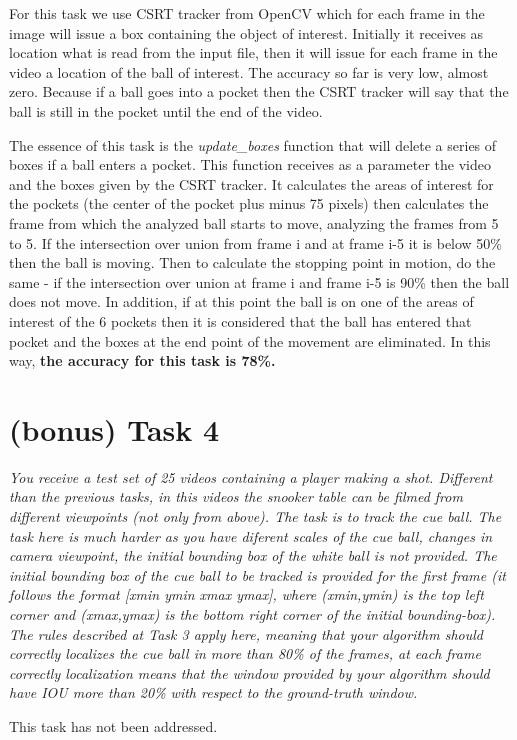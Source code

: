 \documentclass[12pt]{article}
\begin{document}
For this task we use CSRT tracker from OpenCV which for each frame in the image will issue a box containing 
the object of interest. Initially it receives as location what is read from the input file, then it will 
issue for each frame in the video a location of the ball of interest. The accuracy so far is very low, 
almost zero. Because if a ball goes into a pocket then the CSRT tracker will say that the ball is still 
in the pocket until the end of the video. \par

The essence of this task is the \emph{update\_boxes} function that will delete a series of boxes if a ball 
enters a pocket. This function receives as a parameter the video and the boxes given by the CSRT 
tracker. It calculates the areas of interest for the pockets (the center of the pocket plus minus 
75 pixels) then calculates the frame from which the analyzed ball starts to move, analyzing the 
frames from 5 to 5. If the intersection over union from frame i and at frame i-5 it is below 50\% then 
the ball is moving. Then to calculate the stopping point in motion, do the same - if the intersection 
over union at frame i and frame i-5 is 90\% then the ball does not move. In addition, if at this point 
the ball is on one of the areas of interest of the 6 pockets then it is considered that the ball 
has entered that pocket and the boxes at the end point of the movement are eliminated. In this way, 
\textbf{the accuracy for this task is 78\%.} \par

\section*{(bonus) Task 4}

\emph{You receive a test set of 25 videos containing a player making a
shot. Different than the previous tasks, in this videos the snooker table can be filmed
from different viewpoints (not only from above). The task is to track the cue ball.
The task here is much harder as you have diferent scales of the cue ball, changes in
camera viewpoint, the initial bounding box of the white ball is not provided. The
initial bounding box of the cue ball to be tracked is provided for the first frame (it
follows the format [xmin ymin xmax ymax], where (xmin,ymin) is the top left corner
and (xmax,ymax) is the bottom right corner of the initial bounding-box). 
The rules described at Task 3 apply here, meaning that your algorithm should correctly 
localizes the cue ball in more than 80\% of the frames, at each frame correctly localization
means that the window provided by your algorithm should have IOU more than 20\%
with respect to the ground-truth window.}

This task has not been addressed.
\end{document}
